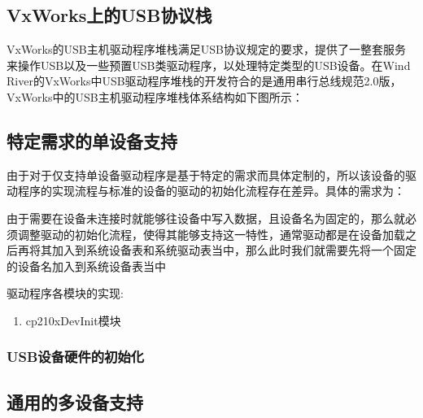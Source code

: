 \subsection{VxWorks上的USB协议栈}
	VxWorks的USB主机驱动程序堆栈满足USB协议规定的要求，提供了一整套服务来操作USB以及一些预置USB类驱动程序，以处理特定类型的USB设备。在Wind River的VxWorks中USB驱动程序堆栈的开发符合的是通用串行总线规范2.0版，VxWorks中的USB主机驱动程序堆栈体系结构如下图所示：




\subsection{特定需求的单设备支持}
	由于对于仅支持单设备驱动程序是基于特定的需求而具体定制的，所以该设备的驱动程序的实现流程与标准的设备的驱动的初始化流程存在差异。具体的需求为：

	由于需要在设备未连接时就能够往设备中写入数据，且设备名为固定的，那么就必须调整驱动的初始化流程，使得其能够支持这一特性，通常驱动都是在设备加载之后再将其加入到系统设备表和系统驱动表当中，那么此时我们就需要先将一个固定的设备名加入到系统设备表当中
	
	
	

驱动程序各模块的实现:
\begin{enumerate}
\item  cp210xDevInit模块

	

\end{enumerate}


\subsubsection{USB设备硬件的初始化}


\subsection{通用的多设备支持}